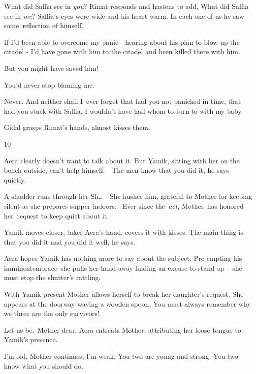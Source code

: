 \documentclass[twoside,11pt]{book}
\begin{document}
{\textquotedbl}What did Saffia see in \textit{you}?{\textquotedbl} Rimat responds and hastens to add,
{\textquotedbl}What did Saffia see in \textit{me}? Saffia's eyes were wide and his heart warm. In each one of us he saw
some\ reflection of himself.{\textquotedbl}\ 

{\textquotedbl}If I'd been able to overcome my panic - hearing about his plan to blow up the citadel - I'd have gone
with him to the citadel and been killed there with him.{\textquotedbl} 

{\textquotedbl}But you might have saved him!{\textquotedbl} 

{\textquotedbl}You'd never stop blaming me.{\textquotedbl} 

{\textquotedbl}Never. And neither shall I\ ever forget that had you not panicked in time, that had you stuck with
Saffia, I wouldn't have had whom to turn to with my baby.{\textquotedbl}

Gidal grasps Rimat's hands, almost kisses them. ~


\bigskip

10 

Aera clearly doesn't want to talk about it. But Yamik, sitting with her on the bench outside, can't help
himself.\ \ {\textquotedbl}The men know that you did it,{\textquotedbl} he says quietly.

A shudder runs through her {\textquotedbl}Sh{\dots}{\textquotedbl}\ \ She hushes him, grateful to Mother for keeping
silent as she prepares supper indoors.~ Ever since the\ \textit{act}, Mother~has honored her\ request to keep quiet
about it.\ 

Yamik moves closer, takes Aera's hand, covers it with kisses. {\textquotedbl}The main thing is that you did it and you
did it well,{\textquotedbl} he says.

Aera hopes Yamik has nothing more to say about the subject. Pre-empting his imminentembrace\ she pulls her hand away
finding an excuse to stand up -\ she must stop the shutter's rattling.\ 

With Yamik present Mother allows herself to break her daughter's request. She appears at the doorway waving a wooden
spoon, {\textquotedbl}You must always remember why we three are the only survivors!{\textquotedbl} 

{\textquotedbl}Let us be,\ Mother dear,{\textquotedbl} Aera entreats Mother, attributing her loose tongue to Yamik's
presence.

{\textquotedbl}I'm old,{\textquotedbl} Mother continues, {\textquotedbl}I'm weak. You two are young and strong. You two
know what you should do.{\textquotedbl}
\end{document}
